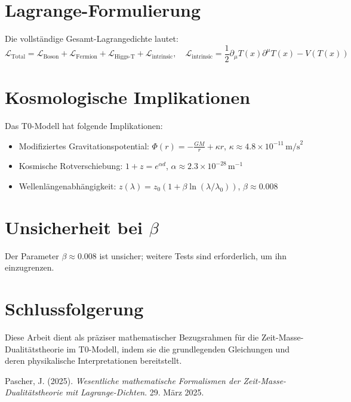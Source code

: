 \documentclass{article}
\newcommand{\Tfield}{T(x)}
\begin{document}
	\section{Lagrange-Formulierung}
	Die vollständige Gesamt-Lagrangedichte lautet:
	\begin{equation}
		\mathcal{L}_{\text{Total}} = \mathcal{L}_{\text{Boson}} + \mathcal{L}_{\text{Fermion}} + \mathcal{L}_{\text{Higgs-T}} + \mathcal{L}_{\text{intrinsic}}, \quad \mathcal{L}_{\text{intrinsic}} = \frac{1}{2} \partial_\mu \Tfield \partial^\mu \Tfield - V(\Tfield)
	\end{equation}
	
	\section{Kosmologische Implikationen}
	Das T0-Modell hat folgende Implikationen:
	\begin{itemize}
		\item Modifiziertes Gravitationspotential: \( \Phi(r) = -\frac{GM}{r} + \kappa r \), \( \kappa \approx 4.8 \times 10^{-11} \, \text{m/s}^2 \)
		\item Kosmische Rotverschiebung: \( 1 + z = e^{\alpha d} \), \( \alpha \approx 2.3 \times 10^{-28} \, \text{m}^{-1} \)
		\item Wellenlängenabhängigkeit: \( z(\lambda) = z_0 (1 + \beta \ln(\lambda/\lambda_0)) \), \( \beta \approx 0.008 \)
	\end{itemize}
	
	\section{Unsicherheit bei \(\beta\)}
	Der Parameter \( \beta \approx 0.008 \) ist unsicher; weitere Tests sind erforderlich, um ihn einzugrenzen.
	
	\section{Schlussfolgerung}
	Diese Arbeit dient als präziser mathematischer Bezugsrahmen für die Zeit-Masse-Dualitätstheorie im T0-Modell, indem sie die grundlegenden Gleichungen und deren physikalische Interpretationen bereitstellt.
	
	\begin{thebibliography}{9}
		 Pascher, J. (2025). \textit{Wesentliche mathematische Formalismen der Zeit-Masse-Dualitätstheorie mit Lagrange-Dichten}. 29. März 2025.
	\end{thebibliography}
	
\end{document}
